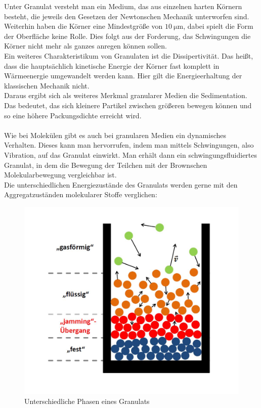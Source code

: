 Unter Granulat versteht man ein Medium, das aus einzelnen harten Körnern besteht, die jeweils den Gesetzen der Newtonschen Mechanik unterworfen sind. Weiterhin haben die Körner eine Mindestgröße von $\SI{10}{\micro\meter}$, dabei spielt die Form der Oberfläche keine Rolle. Dies folgt aus der Forderung, das Schwingungen die Körner nicht mehr als ganzes anregen können sollen. \\
Ein weiteres Charakteristikum von Granulaten ist die Dissipertivität. Das heißt, dass die hauptsächlich kinetische Energie der Körner fast komplett in Wärmeenergie umgewandelt werden kann. Hier gilt die Energieerhaltung der klassischen Mechanik nicht. \\
Daraus ergibt sich als weiteres Merkmal granularer Medien die Sedimentation. Das bedeutet, das sich kleinere Partikel zwischen größeren bewegen können und so eine höhere Packungsdichte erreicht wird. \\
\hfill \\ 
Wie bei Molekülen gibt es auch bei granularen Medien ein dynamisches Verhalten. Dieses kann man hervorrufen, indem man mittels Schwingungen, also Vibration, auf das Granulat einwirkt. Man erhält dann ein schwingungsfluidiertes Granulat, in dem die Bewegung der Teilchen mit der Brownschen Molekularbewegung vergleichbar ist. \\
Die unterschiedlichen Energiezustände des Granulats werden gerne mit den Aggregatzuständen molekularer Stoffe verglichen:


\begin{center}
\begin{figure}[h]
	\includegraphics[scale=0.45]{Einleitung_1.jpg}
	\caption{Unterschiedliche Phasen eines Granulats}
\end{figure}	
\end{center}


